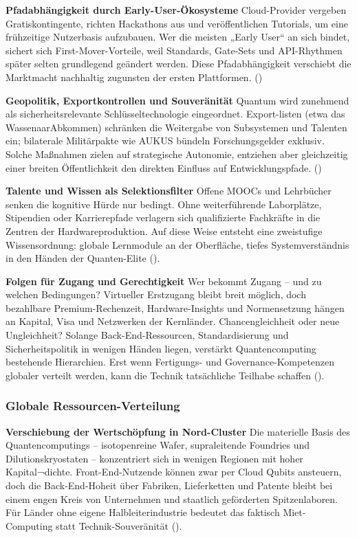 \textbf{Pfadabhängigkeit durch Early-User-Ökosysteme}
Cloud-Provider vergeben Gratiskontingente, richten Hackathons aus und veröffentlichen Tutorials, um eine frühzeitige Nutzerbasis aufzubauen. Wer die meisten „Early User“ an sich bindet, sichert sich First-Mover-Vorteile, weil Standards, Gate-Sets und API-Rhythmen später selten grundlegend geändert werden. Diese Pfadabhängigkeit verschiebt die Marktmacht nachhaltig zugunsten der ersten Plattformen. (\cite{seskirDemocratizationQuantumTechnologies2022})

\textbf{Geopolitik, Exportkontrollen und Souveränität}
Quantum wird zunehmend als sicherheitsrelevante Schlüsseltechnologie eingeordnet. Export-listen (etwa das WassenaarAbkommen) schränken die Weitergabe von Subsystemen und Talenten ein; bilaterale Militärpakte wie AUKUS bündeln Forschungsgelder exklusiv. Solche Maßnahmen zielen auf strategische Autonomie, entziehen aber gleichzeitig einer breiten Öffentlichkeit den direkten Einfluss auf Entwicklungspfade. (\cite{seskirDemocratizationQuantumTechnologies2022})

\textbf{Talente und Wissen als Selektionsfilter}
Offene MOOCs und Lehrbücher senken die kognitive Hürde nur bedingt. Ohne weiterführende Laborplätze, Stipendien oder Karrierepfade verlagern sich qualifizierte Fachkräfte in die Zentren der Hardwareproduktion. Auf diese Weise entsteht eine zweistufige Wissensordnung: globale Lernmodule an der Oberfläche, tiefes Systemverständnis in den Händen der Quanten-Elite (\cite{seskirDemocratizationQuantumTechnologies2022}).

\textbf{Folgen für Zugang und Gerechtigkeit} Wer bekommt Zugang – und zu welchen Bedingungen? Virtueller Erstzugang bleibt breit möglich, doch bezahlbare Premium-Rechenzeit, Hardware-Insights und Normensetzung hängen an Kapital, Visa und Netzwerken der Kernländer.
Chancengleichheit oder neue Ungleichheit?
Solange Back-End-Ressourcen, Standardisierung und Sicherheitspolitik in wenigen Händen liegen, verstärkt Quantencomputing bestehende Hierarchien. Erst wenn Fertigungs- und Governance-Kompetenzen globaler verteilt werden, kann die Technik tatsächliche Teilhabe schaffen (\cite{seskirDemocratizationQuantumTechnologies2022}).


\subsubsection{Globale Ressourcen-Verteilung}
\textbf{Verschiebung der Wertschöpfung in Nord-Cluster}
Die materielle Basis des Quantencomputings – isotopenreine Wafer, supraleitende Foundries und Dilutionskryostaten – konzentriert sich in wenigen Regionen mit hoher Kapital¬dichte. Front-End-Nutzende können zwar per Cloud Qubits ansteuern, doch die Back-End-Hoheit über Fabriken, Lieferketten und Patente bleibt bei einem engen Kreis von Unternehmen und staatlich geförderten Spitzenlaboren. Für Länder ohne eigene Halbleiterindustrie bedeutet das faktisch Miet-Computing statt Technik-Souveränität (\cite{seskirDemocratizationQuantumTechnologies2022}).

